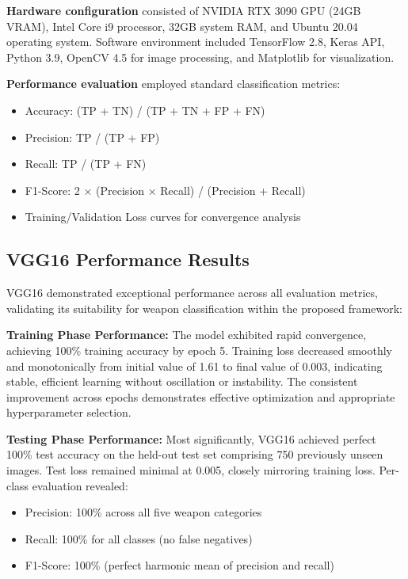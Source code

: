 \documentclass[conference]{IEEEtran}
\begin{document}
\textbf{Hardware configuration} consisted of NVIDIA RTX 3090 GPU (24GB VRAM), Intel Core i9 processor, 32GB system RAM, and Ubuntu 20.04 operating system. Software environment included TensorFlow 2.8, Keras API, Python 3.9, OpenCV 4.5 for image processing, and Matplotlib for visualization.

\textbf{Performance evaluation} employed standard classification metrics:

\begin{itemize}
\item Accuracy: (TP + TN) / (TP + TN + FP + FN)
\item Precision: TP / (TP + FP)
\item Recall: TP / (TP + FN)
\item F1-Score: 2 × (Precision × Recall) / (Precision + Recall)
\item Training/Validation Loss curves for convergence analysis
\end{itemize}

\subsection{VGG16 Performance Results}

VGG16 demonstrated exceptional performance across all evaluation metrics, validating its suitability for weapon classification within the proposed framework:

\textbf{Training Phase Performance:} The model exhibited rapid convergence, achieving 100\% training accuracy by epoch 5. Training loss decreased smoothly and monotonically from initial value of 1.61 to final value of 0.003, indicating stable, efficient learning without oscillation or instability. The consistent improvement across epochs demonstrates effective optimization and appropriate hyperparameter selection.

\textbf{Testing Phase Performance:} Most significantly, VGG16 achieved perfect 100\% test accuracy on the held-out test set comprising 750 previously unseen images. Test loss remained minimal at 0.005, closely mirroring training loss. Per-class evaluation revealed:

\begin{itemize}
\item Precision: 100\% across all five weapon categories
\item Recall: 100\% for all classes (no false negatives)
\item F1-Score: 100\% (perfect harmonic mean of precision and recall)
\end{itemize}
\end{document}
